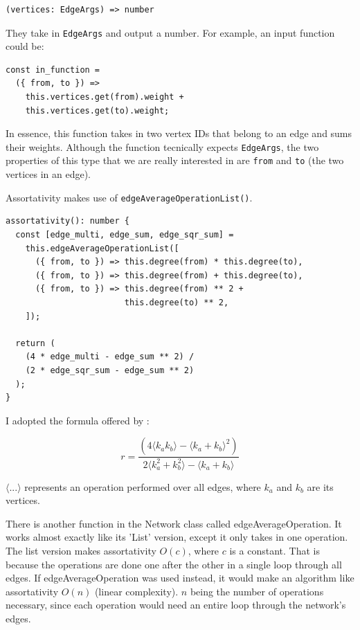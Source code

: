 \begin{verbatim}
(vertices: EdgeArgs) => number
\end{verbatim}

They take in \texttt{EdgeArgs} and output a number.
For example, an input function could be:

\begin{verbatim}
const in_function =
  ({ from, to }) =>
    this.vertices.get(from).weight +
    this.vertices.get(to).weight;
\end{verbatim}

In essence, this function takes in two vertex IDs that belong to an edge and sums their weights.
Although the function tecnically expects \texttt{EdgeArgs},
the two properties of this type that we are really interested in are \texttt{from}
and \texttt{to} (the two vertices in an edge).

Assortativity makes use of \texttt{edgeAverageOperationList()}.

\begin{verbatim}
assortativity(): number {
  const [edge_multi, edge_sum, edge_sqr_sum] =
    this.edgeAverageOperationList([
      ({ from, to }) => this.degree(from) * this.degree(to),
      ({ from, to }) => this.degree(from) + this.degree(to),
      ({ from, to }) => this.degree(from) ** 2 +
                        this.degree(to) ** 2,
    ]);

  return (
    (4 * edge_multi - edge_sum ** 2) /
    (2 * edge_sqr_sum - edge_sum ** 2)
  );
}
\end{verbatim}

I adopted the formula offered by \cite{ref:barrenas}:

$$r=\frac{(4\langle k_a k_b\rangle-\langle k_a+k_b\rangle^2)}{2\langle k_a^2+k_b^2\rangle-\langle k_a+k_b\rangle}$$

$\langle ... \rangle$ represents an operation performed over all edges,
where $k_a$ and $k_b$ are its vertices.

There is another function in the Network class called edgeAverageOperation.
It works almost exactly like its 'List' version, except it only takes in one operation.
The list version makes assortativity $O(c)$, where $c$ is a constant.
That is because the operations are done one after the other in a single loop through all edges.
If edgeAverageOperation was used instead, it would make an algorithm like assortativity $O(n)$ (linear complexity).
$n$ being the number of operations necessary, since each operation would need an entire loop through the network's edges.

